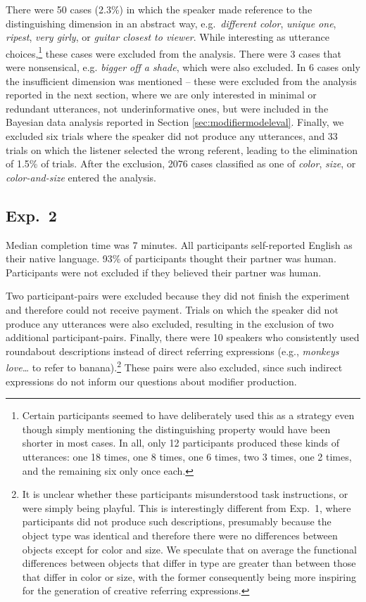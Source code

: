 \documentclass[11pt]{article}
\newcommand{\sectionref}[1]{Section \ref{#1}}
\begin{document}
There were 50 cases (2.3\%) in which the speaker made reference to the distinguishing dimension in an abstract way, e.g.~\emph{different color}, \emph{unique one}, \emph{ripest}, \emph{very girly}, or \emph{guitar closest to viewer}. While interesting as utterance choices,\footnote{Certain participants seemed to have deliberately used this as a strategy even though simply mentioning the distinguishing property would have been shorter in most cases. In all, only 12 participants produced these kinds of utterances: one 18 times, one 8 times, one 6 times, two 3 times, one 2 times, and the remaining six only once each.} these cases were excluded from the analysis. There were 3 cases that were nonsensical, e.g. \emph{bigger off a shade}, which were also excluded. In 6 cases only the insufficient dimension was mentioned -- these were excluded from the analysis reported in the next section, where we are only interested in minimal or redundant utterances, not underinformative ones, but were included in the Bayesian data analysis reported in \sectionref{sec:modifiermodeleval}. Finally, we excluded six trials where the speaker did not produce any utterances, and 33 trials on which the listener selected the wrong referent, leading to the elimination of 1.5\% of trials. After the exclusion, 2076 cases classified as one of \emph{color}, \emph{size}, or \emph{color-and-size} entered the analysis. 


\subsection{Exp.~2}

Median completion time was 7 minutes. All participants self-reported English as their native language. 93\% of participants thought their partner was human. Participants were not excluded if they believed their partner was human.

Two participant-pairs were excluded because they did not finish the experiment and therefore could not receive payment. Trials on which the speaker did not produce any utterances were also excluded, resulting in the exclusion of two additional participant-pairs.
Finally, there were 10 speakers who consistently used roundabout descriptions instead of direct referring expressions (e.g., \emph{monkeys love\dots} to refer to banana).\footnote{It is unclear whether these participants misunderstood task instructions, or were simply being playful. This is interestingly different from Exp.~1, where participants did not produce such descriptions, presumably because the object type was identical and therefore there were no differences between objects except for color and size. We speculate that on average the functional differences between objects that differ in type are greater than between those that differ in color or size, with the former consequently being more inspiring for the generation of creative referring expressions.} These pairs were also excluded, since such indirect expressions do not inform our questions about modifier production.
\end{document}
